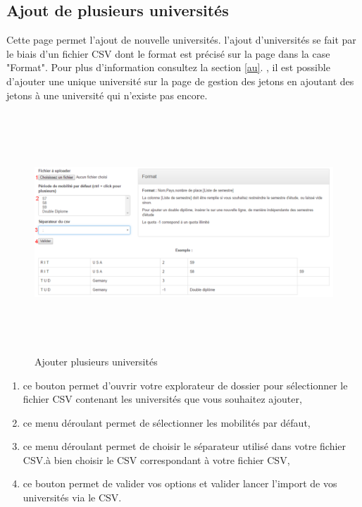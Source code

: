   \subsection{Ajout de plusieurs universités}
  \label{pau}
  Cette page permet l'ajout de nouvelle universités. l'ajout d'universités se fait par le biais d'un fichier CSV dont le format est précisé sur la page dans la case "Format". Pour plus d'information consultez la section \ref{au}. \att, il est possible d'ajouter une unique université sur la page de gestion des jetons en ajoutant des jetons à une université qui n'existe pas encore.
  \begin{figure}[H]
  	\centering
  	\includegraphics[width=16cm,height=9cm]{Images/Admin/ajout_plusieux_univ_admin.png}
  	\caption{Ajouter plusieurs universités}
  	
  \end{figure}
  \begin{enumerate}
  	\item ce bouton permet d'ouvrir votre explorateur de dossier pour sélectionner le fichier CSV contenant les universités que vous souhaitez ajouter,
  	\item ce menu déroulant permet de sélectionner les mobilités par défaut,
  	\item ce menu déroulant permet de choisir le séparateur utilisé dans votre fichier CSV.\att à bien choisir le CSV correspondant à votre fichier CSV,
  	\item ce bouton permet de valider vos options et valider lancer l'import de vos universités via le CSV.
  \end{enumerate}
  
